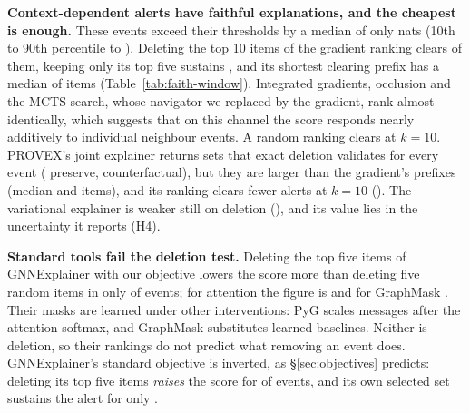 \documentclass[conference]{IEEEtran}
\begin{document}

\textbf{Context-dependent alerts have faithful explanations, and the cheapest is enough.} These
\HAWinN{} events exceed their thresholds by a median of only \HAWinMargin{} nats (10th to 90th
percentile \HAWinMarginLo{} to \HAWinMarginHi{}). Deleting the top 10 items of the gradient ranking
clears \HAWinGradientFlipTen{} of them, keeping only its top five sustains \HAWinGradientKeepFive{},
and its shortest clearing prefix has a median of \HAWinGradientMinCF{} items
(Table~\ref{tab:faith-window}). Integrated gradients, occlusion and the MCTS search, whose navigator we
replaced by the gradient, rank almost identically, which suggests that on this channel the score responds
nearly additively to individual neighbour events. A random ranking clears \HAWinRandomFlipTen{} at
$k{=}10$. PROVEX's joint explainer returns sets that exact deletion validates for every event
(\HAWinJointOwnValid{} preserve, \HAWinJointCFOwnValid{} counterfactual), but they are larger than the
gradient's prefixes (median \HAWinJointOwnSize{} and \HAWinJointCFOwnSize{} items), and its ranking clears
fewer alerts at $k{=}10$ (\HAWinJointFlipTen{}). The variational explainer is weaker still on deletion
(\HAWinVariationalFlipTen{}), and its value lies in the uncertainty it reports (H4).

\textbf{Standard tools fail the deletion test.} Deleting the top five items of GNNExplainer with our
objective lowers the score more than deleting five random items in only \HAWinGnnxAnomalyWinsFive{} of
events; for attention the figure is \HAWinAttentionWinsFive{} and for GraphMask \HAWinGraphMaskWinsFive{}.
Their masks are learned under other interventions: PyG scales messages after the attention softmax, and
GraphMask substitutes learned baselines. Neither is deletion, so their rankings do not predict what
removing an event does. GNNExplainer's standard objective is inverted, as \S\ref{sec:objectives} predicts: deleting its top
five items \emph{raises} the score for \HAWinGnnxVoneRaisesFive{} of events, and its own selected set
sustains the alert for only \HAWinGnnxVoneOwnValid{}.
\end{document}
